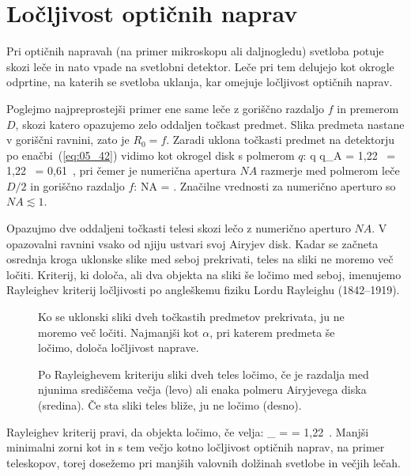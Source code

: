 \section{Ločljivost optičnih naprav}
Pri optičnih napravah (na primer mikroskopu ali daljnogledu) 
svetloba potuje skozi leče in nato vpade na svetlobni detektor. Leče pri tem delujejo
kot okrogle odprtine, na katerih se svetloba uklanja, kar omejuje ločljivost 
optičnih naprav.

Poglejmo najpreprostejši primer ene same leče z goriščno razdaljo $f$ in premerom $D$,
skozi katero opazujemo zelo oddaljen točkast predmet. Slika predmeta 
nastane v goriščni ravnini, zato je $R_0=f$. Zaradi uklona točkasti predmet na 
detektorju po enačbi~(\ref{eq:05_42}) vidimo kot okrogel disk s polmerom $q$:
\beq
q \approx q_A = 1,22~ = 1,22~ = 0,61~,
\label{eq:05_43}
\eeq
pri čemer je numerična apertura $NA$ razmerje med polmerom leče $D/2$
in goriščno razdaljo $f$:
\beq
NA = .
\label{eq:05_44}
\eeq
Značilne vrednosti za numerično aperturo so $NA \lesssim 1$.

Opazujmo dve oddaljeni točkasti telesi skozi lečo z numerično aperturo $NA$. 
V opazovalni ravnini vsako od njiju ustvari svoj Airyjev disk. Kadar se začneta osrednja
kroga uklonske slike med seboj prekrivati, teles na sliki ne moremo več ločiti. Kriterij, ki določa,
ali dva objekta na sliki še ločimo med seboj, imenujemo
Rayleighev kriterij ločljivosti po angleškemu fiziku Lordu Rayleighu (1842--1919). 
\begin{figure}[ht]
\centering
\def\svgwidth{120truemm} 

\caption{Ko se uklonski sliki dveh točkastih predmetov prekrivata, ju ne moremo več ločiti.
Najmanjši kot $\alpha$, pri katerem predmeta še ločimo, določa ločljivost naprave.}
\label{fig:05_locljivost}
\end{figure}

\begin{figure}[ht]
\centering
\def\svgwidth{120truemm} 

\caption{Po Rayleighevem kriteriju sliki dveh teles ločimo, če je razdalja med
njunima središčema večja (levo) ali enaka polmeru Airyjevega diska (sredina). Če 
sta sliki teles bliže, ju ne ločimo (desno).}
\label{fig:05_locljivost2}
\end{figure}

Rayleighev kriterij pravi, da objekta ločimo, če velja:
\beq
\alpha \ge \alpha_{} = 
 = 1,22~.
\label{eq:05_46}
\eeq
Manjši minimalni zorni kot in s tem večjo kotno 
ločljivost optičnih naprav, na primer teleskopov, torej
dosežemo pri manjših valovnih dolžinah svetlobe in večjih lečah.

